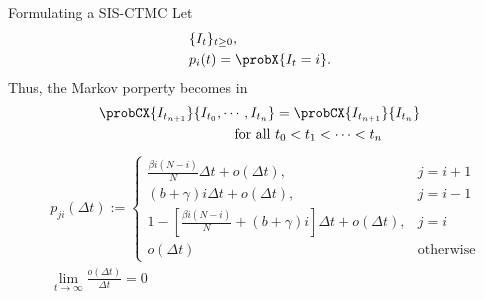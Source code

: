     \begin{frame}{Formulating a SIS-CTMC }
        Let 
        \begin{align*}
            & \{ I_t\}_{t \geq 0},
            \\
            & p_i(t) = \probX{I_t = i}.
        \end{align*}
        Thus, the Markov porperty becomes in
        \begin{align*}
            \probCX{ I_{t_{n + 1}}}{I_{t_0}, \cdots, I_{t_n} }
                &=
                \probCX{ I_{t_{n + 1}}}{I_{t_n}}
                \\
                \text{for all } &
                t_0 < t_1 < \cdots < t_n 
        \end{align*}
        \begin{align*}
            &p_{ji}(\Delta t):=
                \begin{cases}
                    \frac{\beta i (N - i)}{N} \Delta t 
                        + o(\Delta t),     
                        & j = i + 1
                    \\
                    (b + \gamma) i \Delta t 
                        + o(\Delta t),
                        &   j = i - 1
                    \\
                    1 - \left [
                            \frac{\beta i (N - i)}{N} +
                            (b + \gamma) i %
                        \right] \Delta t
                        + o(\Delta t) , 
                        & j=i
                    \\
                    o(\Delta t) & \text{otherwise}
                \end{cases}
            \\
            & \lim_{t\to \infty}
                \frac{o(\Delta t)}{\Delta t}
                = 0
        \end{align*}
    \end{frame}
